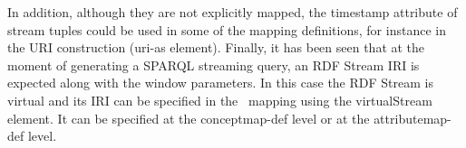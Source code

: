 In addition, although they are not explicitly mapped, the timestamp attribute of stream tuples could be used in some of the mapping definitions, for instance in the URI construction (\textsf{uri-as} element).
Finally, it has been seen that at the moment of generating a SPARQL streaming query, an RDF Stream IRI is expected along with the window parameters. In this case the RDF Stream is virtual and its IRI can be specified in the \stwoo\ mapping using the \textsf{virtualStream} element. It can be specified at the \textsf{conceptmap-def} level or at the \textsf{attributemap-def} level.




